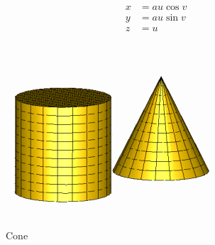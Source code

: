 \documentclass[14pt,a4paper,titlepage]{article}
\begin{document}
\begin{itemize}
\begin{itemize}
					\begin{align*}
						x &= au\cos{v}\\
						y &= au\sin{v}\\
						z &= u
					\end{align*}
					\begin{figure}[h!]
						\centering
						\includegraphics[width=0.5\linewidth]{cone.png}
						\caption{Cone}
						\label{fig6}
					\end{figure}
			\end{itemize}
			
		  
		\end{itemize}
\end{document}
